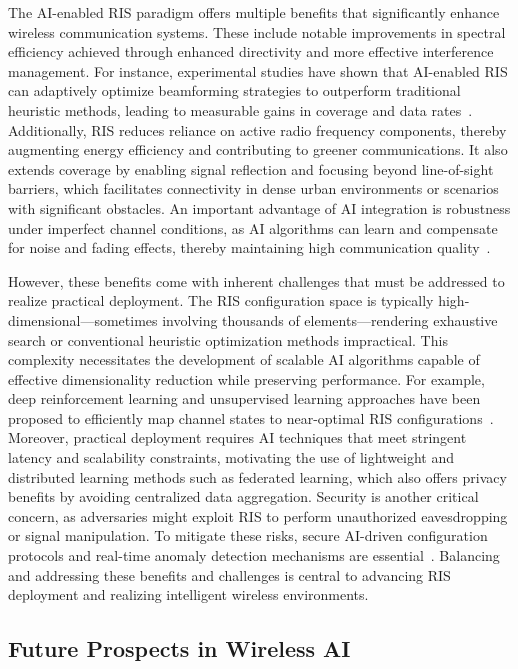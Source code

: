\documentclass[sigconf]{acmart}
\begin{document}
The AI-enabled RIS paradigm offers multiple benefits that significantly enhance wireless communication systems. These include notable improvements in spectral efficiency achieved through enhanced directivity and more effective interference management. For instance, experimental studies have shown that AI-enabled RIS can adaptively optimize beamforming strategies to outperform traditional heuristic methods, leading to measurable gains in coverage and data rates~\cite{ref49}. Additionally, RIS reduces reliance on active radio frequency components, thereby augmenting energy efficiency and contributing to greener communications. It also extends coverage by enabling signal reflection and focusing beyond line-of-sight barriers, which facilitates connectivity in dense urban environments or scenarios with significant obstacles. An important advantage of AI integration is robustness under imperfect channel conditions, as AI algorithms can learn and compensate for noise and fading effects, thereby maintaining high communication quality~\cite{ref49}.

However, these benefits come with inherent challenges that must be addressed to realize practical deployment. The RIS configuration space is typically high-dimensional—sometimes involving thousands of elements—rendering exhaustive search or conventional heuristic optimization methods impractical. This complexity necessitates the development of scalable AI algorithms capable of effective dimensionality reduction while preserving performance. For example, deep reinforcement learning and unsupervised learning approaches have been proposed to efficiently map channel states to near-optimal RIS configurations~\cite{ref49}. Moreover, practical deployment requires AI techniques that meet stringent latency and scalability constraints, motivating the use of lightweight and distributed learning methods such as federated learning, which also offers privacy benefits by avoiding centralized data aggregation. Security is another critical concern, as adversaries might exploit RIS to perform unauthorized eavesdropping or signal manipulation. To mitigate these risks, secure AI-driven configuration protocols and real-time anomaly detection mechanisms are essential~\cite{ref49}. Balancing and addressing these benefits and challenges is central to advancing RIS deployment and realizing intelligent wireless environments.

\subsection{Future Prospects in Wireless AI}
\end{document}
